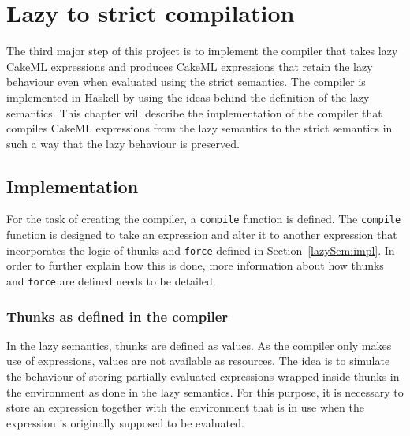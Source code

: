 \chapter{Lazy to strict compilation}
\label{chapter:compiler}
The third major step of this project is to implement the compiler that takes
lazy CakeML expressions and produces CakeML expressions that retain the lazy
behaviour even when evaluated using the strict semantics.
The compiler is implemented in Haskell by using the ideas
behind the definition of the lazy semantics. This chapter will describe the
implementation of the compiler that compiles CakeML expressions from the lazy
semantics to the strict semantics in such a way that the lazy behaviour
is preserved.

\section{Implementation}

For the task of creating the compiler, a \texttt{compile} function is defined.
The \texttt{compile} function is designed to take an expression and alter it to
another expression that incorporates the logic of thunks and \texttt{force} defined in
Section~\ref{lazySem:impl}. In order to further explain how this is done,
more information about how thunks and \texttt{force} are defined needs to
be detailed.

\subsection{Thunks as defined in the compiler}
\label{comp:thunk}
In the lazy semantics, thunks are defined as values. As the compiler only makes
use of expressions, values are not available as resources.
The idea is to simulate the behaviour of storing partially evaluated expressions
wrapped inside thunks in the environment as done in the lazy semantics.
For this purpose, it is necessary to store an expression
together with the environment that is in use when the expression is originally
supposed to be evaluated.

